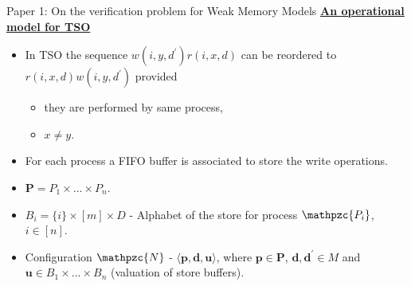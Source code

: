 \documentclass[9pt]{beamer}
\begin{document}
\begin{frame}{Paper 1: On the verification problem for Weak Memory Models}
\underline{\textbf{An operational model for TSO}}
\begin{itemize}
\item In TSO the sequence $w(i, y, d^{\prime})r(i,x,d)$ can be reordered to $r(i,x,d)w(i, y, d^{\prime})$
		  provided
			\begin{itemize}
			\item they are performed by same process,
			\item $x \neq y$.
			\end{itemize}
\item For each process a FIFO buffer is associated to store the write operations.
\pause
\item $\mathbf{P} = P_1 \times...\times P_n$.
\item $B_i = \{i\} \times [m] \times D$ - Alphabet of the store for process $\mathpzc{P_i}$, $i \in [n]$.
\pause
\item Configuration $\mathpzc{N}$ - $\langle \mathbf{p}, \mathbf{d}, \mathbf{u} \rangle$, where $\mathbf{p} \in \mathbf{P}$,
	    $\mathbf{d}, \mathbf{d^{\prime}} \in M$ and $\mathbf{u} \in B_1 \times...\times B_n$ (valuation of 
			store buffers).
\end{itemize}
\end{frame}
\end{document}

